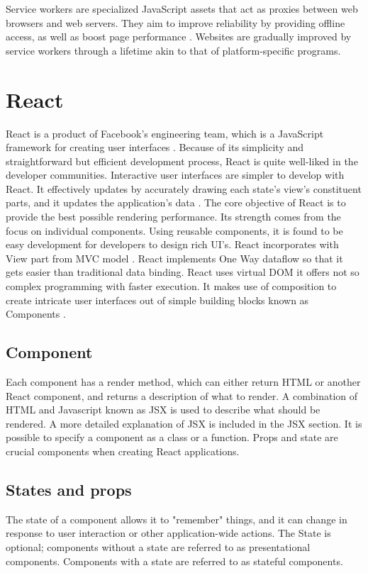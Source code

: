 Service workers are specialized JavaScript assets that act as proxies between web browsers and web servers. They aim to improve reliability by providing offline access, as well as boost page performance \autocite{chrome2021service}. Websites are gradually improved by service workers through a lifetime akin to that of platform-specific programs.


\section{React}
React is a product of Facebook's engineering team, which is a JavaScript framework for creating user interfaces \autocite{gackenheimer2015introducing}. Because of its simplicity and straightforward but efficient development process, React is quite well-liked in the developer communities. Interactive user interfaces are simpler to develop with React. It effectively updates by accurately drawing each state's view's constituent parts, and it updates the application's data \autocite{islam2017reactjs}. The core objective of React is to provide the best possible rendering performance. Its strength comes from the focus on individual components. Using reusable components, it is found to be easy development for developers to design rich UI's. React incorporates with View part from MVC model \autocite{maratkar2021re}. React implements One Way dataflow so that it gets easier than traditional data binding. React uses virtual DOM it offers not so complex programming with faster execution. It makes use of composition to create intricate user interfaces out of simple building blocks known as Components \autocite{david2020building}.

\subsection*{Component}
Each component has a render method, which can either return HTML or another React component, and returns a description of what to render. A combination of HTML and Javascript known as JSX is used to describe what should be rendered. A more detailed explanation of JSX is included in the JSX section. It is possible to specify a component as a class or a function. Props and state are crucial components when creating React applications.

\subsection*{States and props}
The state of a component allows it to "remember" things, and it can change in response to user interaction or other application-wide actions. The State is optional; components without a state are referred to as presentational components. Components with a state are referred to as stateful components.

